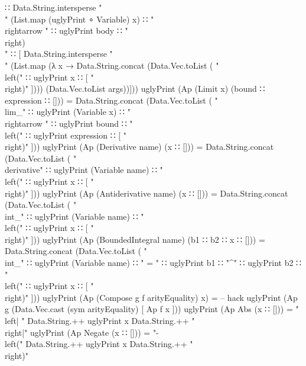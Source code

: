 \documentclass{report}
\begin{document}
\begin{code}
      ∷ Data.String.intersperse
          "\\ "
          (List.map (uglyPrint ∘ Variable) x)
      ∷ " \\rightarrow "
      ∷ uglyPrint body
      ∷ "\\right)\\ "
      ∷ [ Data.String.intersperse
            "\\ "
            (List.map
              (λ x → Data.String.concat (Data.Vec.toList
                       ( "\\left("
                       ∷ uglyPrint x
                       ∷ [ "\\right)" ])))
              (Data.Vec.toList args))]))
  uglyPrint (Ap (Limit x) (bound ∷ expression ∷ [])) =
    Data.String.concat (Data.Vec.toList
      ( "\\lim_{"
      ∷ uglyPrint (Variable x)
      ∷ " \\rightarrow "
      ∷ uglyPrint bound
      ∷ "} \\left("
      ∷ uglyPrint expression
      ∷ [ "\\right)" ]))
  uglyPrint (Ap (Derivative name) (x ∷ [])) =
    Data.String.concat (Data.Vec.toList
      ( "\\derivative{"
      ∷ uglyPrint (Variable name)
      ∷ "} \\left("
      ∷ uglyPrint x
      ∷ [ "\\right)" ]))
  uglyPrint (Ap (Antiderivative name) (x ∷ [])) =
    Data.String.concat (Data.Vec.toList
      ( "\\int_{"
      ∷ uglyPrint (Variable name)
      ∷ "} \\left("
      ∷ uglyPrint x
      ∷ [ "\\right)" ]))
  uglyPrint (Ap (BoundedIntegral name) (b1 ∷ b2 ∷ x ∷ [])) =
    Data.String.concat (Data.Vec.toList
      ( "\\int_{"
      ∷ uglyPrint (Variable name)
      ∷ " = "
      ∷ uglyPrint b1
      ∷ "}^{"
      ∷ uglyPrint b2
      ∷ "} \\left("
      ∷ uglyPrint x
      ∷ [ "\\right)" ]))
  uglyPrint (Ap (Compose g f arityEquality) x) =
    -- hack
    uglyPrint (Ap g (Data.Vec.cast (sym arityEquality) [ Ap f x ]))
  uglyPrint (Ap Abs (x ∷ [])) =
    "\\left| " Data.String.++ uglyPrint x Data.String.++ "\\right|"
  uglyPrint (Ap Negate (x ∷ [])) =
    "- \\left(" Data.String.++ uglyPrint x Data.String.++ "\\right)"

\end{code}
\end{document}
